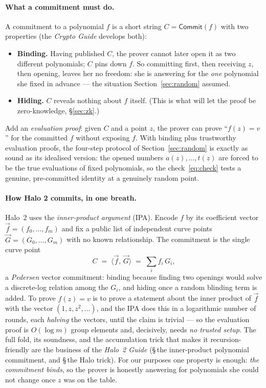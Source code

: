 \documentclass[11pt,a4paper]{article}
\theoremstyle{definition}
\newcommand{\ip}[2]{\langle #1,\, #2 \rangle}
\newcommand{\Comm}{\mathsf{Commit}}
\begin{document}
\paragraph{What a commitment must do.} A commitment to a polynomial $f$ is a
short string $C = \Comm(f)$ with two properties (the \emph{Crypto Guide}
develops both):
\begin{itemize}[leftmargin=*,itemsep=1pt]
\item \textbf{Binding.} Having published $C$, the prover cannot later open it as
two different polynomials; $C$ pins down $f$. So committing first, then
receiving $z$, then opening, leaves her no freedom: she is answering for the
\emph{one} polynomial she fixed in advance --- the situation
Section~\ref{sec:random} assumed.
\item \textbf{Hiding.} $C$ reveals nothing about $f$ itself. (This is what
will let the proof be zero-knowledge, \S\ref{sec:zk}.)
\end{itemize}
Add an \emph{evaluation proof}: given $C$ and a point $z$, the prover can prove
``$f(z) = v$'' for the committed $f$ without exposing $f$. With binding plus
trustworthy evaluation proofs, the four-step protocol of
Section~\ref{sec:random} is exactly as sound as its idealised version: the
opened numbers $a(z), \dots, t(z)$ are forced to be the true evaluations of
fixed polynomials, so the check~\eqref{eq:check} tests a genuine, pre-committed
identity at a genuinely random point.

\paragraph{How Halo 2 commits, in one breath.} Halo~2 uses the
\emph{inner-product argument} (IPA). Encode $f$ by its coefficient vector
$\vec f = (f_0, \dots, f_{m})$ and fix a public list of independent curve
points $\vec G = (G_0, \dots, G_{m})$ with no known relationship. The
commitment is the single curve point
\[
C \;=\; \ip{\vec f}{\vec G} \;=\; \sum_i f_i\,G_i,
\]
a \emph{Pedersen} vector commitment: binding because finding two openings would
solve a discrete-log relation among the $G_i$, and hiding once a random
blinding term is added. To prove $f(z) = v$ is to prove a statement about the
inner product of $\vec f$ with the vector $(1, z, z^2, \dots)$, and the IPA
does this in a logarithmic number of rounds, each \emph{halving} the vectors,
until the claim is trivial --- so the evaluation proof is $O(\log m)$ group
elements and, decisively, needs \emph{no trusted setup}. The full fold, its
soundness, and the accumulation trick that makes it recursion-friendly are the
business of the \emph{Halo~2 Guide} (\S\,the inner-product polynomial
commitment, and \S\,the Halo trick). For our purposes one property is enough:
\emph{the commitment binds}, so the prover is honestly answering for
polynomials she could not change once $z$ was on the table.
\end{document}
